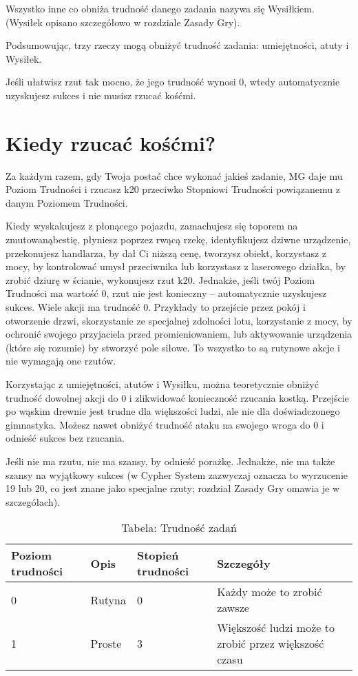 Wszystko inne co obniża trudność danego zadania nazywa się Wysiłkiem. (Wysiłek opisano szczegółowo w rozdziale Zasady Gry).

Podsumowując, trzy rzeczy mogą obniżyć trudność zadania: umiejętności, atuty i Wysiłek. 

Jeśli ułatwisz rzut tak mocno, że jego trudność wynosi 0, wtedy automatycznie uzyskujesz sukces i nie musisz rzucać kośćmi. 

\section {Kiedy rzucać kośćmi?}

Za każdym razem, gdy Twoja postać chce wykonać jakieś zadanie, MG daje mu Poziom Trudności i rzucasz k20 przeciwko Stopniowi Trudności powiązanemu z danym Poziomem Trudności.

Kiedy wyskakujesz z płonącego pojazdu, zamachujesz się toporem na zmutowanąbestię, płyniesz poprzez rwącą rzekę, identyfikujesz dziwne urządzenie, przekonujesz handlarza, by dał Ci niższą cenę, tworzysz obiekt, korzystasz z mocy, by kontrolować umysł przeciwnika lub korzystasz z laserowego działka, by zrobić dziurę w ścianie, wykonujesz rzut k20.
Jednakże, jeśli twój Poziom Trudności ma wartość 0, rzut nie jest konieczny – automatycznie uzyskujesz sukces. Wiele akcji ma trudność 0. Przykłady to przejście przez pokój i otworzenie drzwi, skorzystanie ze specjalnej zdolności lotu, korzystanie z mocy, by ochronić swojego przyjaciela przed promieniowaniem, lub aktywowanie urządzenia (które się rozumie) by stworzyć pole siłowe. To wszystko to są rutynowe akcje i nie wymagają one rzutów.

Korzystając z umiejętności, atutów i Wysiłku, można teoretycznie obniżyć trudność dowolnej akcji do 0 i zlikwidować konieczność rzucania kostką. Przejście po wąskim drewnie jest trudne dla większości ludzi, ale nie dla doświadczonego gimnastyka. Możesz nawet obniżyć trudność ataku na swojego wroga do 0 i odnieść sukces bez rzucania.

Jeśli nie ma rzutu, nie ma szansy, by odnieść porażkę. Jednakże, nie ma także szansy na wyjątkowy sukces (w Cypher System zazwyczaj oznacza to wyrzucenie 19 lub 20, co jest znane jako specjalne rzuty; rozdział Zasady Gry omawia je w szczegółach).

\begin{table*}[t]
 \centering
 \begin{tabular}{l l l l}
   Poziom trudności & Opis & Stopień trudności & Szczegóły  \\ \hline
    0 & Rutyna & 0 & Każdy może to zrobić zawsze \\ \hline
    1 & Proste & 3 & Większość ludzi może to zrobić przez większość czasu \\ \hline
 \end{tabular}
  \caption {Tabela: Trudność zadań}
  \label {Tabela: Trudność zadań}
  \end{table*}

